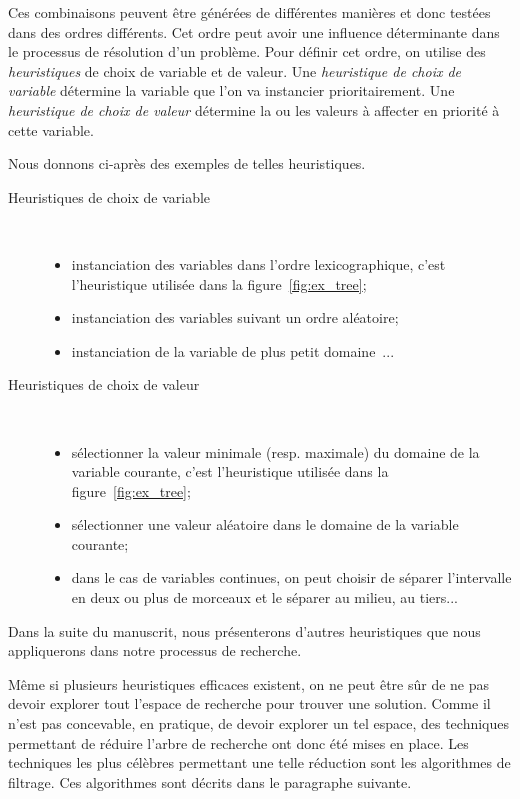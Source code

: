 Ces combinaisons peuvent être générées de différentes manières et donc
testées dans des ordres différents. Cet ordre peut avoir une influence
déterminante dans le processus de résolution d'un problème. Pour
définir cet ordre, on utilise des {\it heuristiques} de choix de
variable et de valeur. Une {\it heuristique de choix de
  variable} détermine la variable que l'on va instancier
prioritairement. Une {\it heuristique de choix de
  valeur} détermine la ou les valeurs à affecter en priorité à
cette variable. 

Nous donnons ci-après des exemples de telles heuristiques. 
\begin{description}
\item[Heuristiques de choix de variable]~

  \begin{itemize}
  \item instanciation des variables dans l'ordre lexicographique,
    c'est l'heuristique utilisée dans la figure~\ref{fig:ex_tree};
  \item instanciation des variables suivant un ordre aléatoire;
  \item instanciation de la variable de plus petit domaine~\cite{min_dom}...
  \end{itemize}
\item[Heuristiques de choix de valeur] ~

  \begin{itemize}
  \item sélectionner la valeur minimale (resp. maximale) du domaine de
    la variable courante, c'est l'heuristique utilisée dans la
    figure~\ref{fig:ex_tree}; 
  \item sélectionner une valeur aléatoire dans le domaine de la
    variable courante;
  \item dans le cas de variables continues, on peut choisir de séparer
    l'intervalle en deux ou plus de morceaux et le séparer au milieu,
    au tiers...
  \end{itemize}
\end{description}
Dans la suite du manuscrit, nous présenterons d'autres heuristiques
que nous appliquerons dans notre processus de recherche. 

Même si plusieurs heuristiques efficaces existent, on ne peut être sûr
de ne pas devoir explorer tout l'espace de recherche pour trouver une
solution. Comme il n'est pas concevable, en pratique, de devoir
explorer un tel espace, des techniques permettant de réduire l'arbre
de recherche ont donc été mises en place. Les techniques les plus
célèbres permettant une telle réduction sont les algorithmes de
filtrage. Ces algorithmes sont décrits dans le paragraphe suivante.


